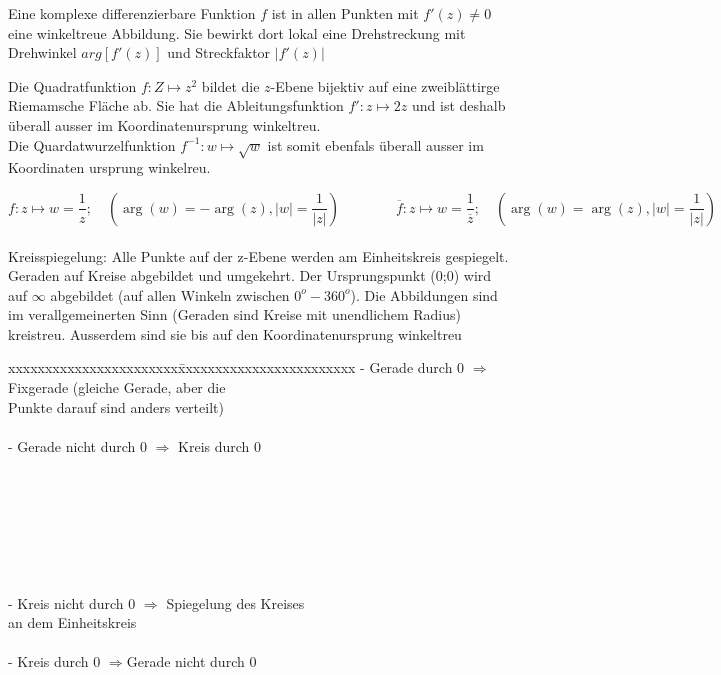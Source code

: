 			Eine komplexe differenzierbare Funktion $f$ ist in allen Punkten mit $f'(z)\neq0$ eine winkeltreue Abbildung. Sie bewirkt dort lokal eine Drehstreckung mit Drehwinkel $arg\left[f'(z)\right]$ und Streckfaktor $\left|f'(z)\right|$

			Die Quadratfunktion $f:Z\mapsto z^2$ bildet die $z$-Ebene bijektiv auf eine zweiblättirge Riemamsche Fläche ab. Sie hat die Ableitungsfunktion $f':z\mapsto 2z$ und ist deshalb überall ausser im Koordinatenursprung winkeltreu.\\
			Die Quardatwurzelfunktion $f^{-1}:w \mapsto \sqrt{w}$ ist somit ebenfals überall ausser im Koordinaten ursprung winkelreu.

  		$$ f : z \mapsto w = \frac{1}{z}; \quad (\arg(w) = -\arg(z), |w| = \frac{1}{|z|})
  		\qquad \qquad 
  		\overline{f}: z \mapsto w = \frac{1}{\overline{z}};  \quad  
  		(\arg(w) = \arg(z), |w| = \frac{1}{|z|}) $$\\
 		Kreisspiegelung: Alle Punkte auf der z-Ebene werden am Einheitskreis gespiegelt. Geraden auf Kreise abgebildet und umgekehrt. Der Ursprungspunkt (0;0) wird auf $ \infty $ abgebildet (auf allen Winkeln zwischen $0^o-360^o$). Die Abbildungen sind im verallgemeinerten Sinn (Geraden sind Kreise mit unendlichem Radius) kreistreu. Ausserdem sind sie bis auf den Koordinatenursprung winkeltreu\\
  		\begin{minipage}{9cm}
    		\begin{tabbing}
	    		xxxxxxxxxxxxxxxxxxxxxxx\=xxxxxxxxxxxxxxxxxxxxxxxx\kill
          		- Gerade durch 0 $\Longrightarrow$ \>Fixgerade (gleiche Gerade, aber die \\ \>Punkte darauf sind anders verteilt)\\ \\
      			- Gerade nicht durch 0 $\Longrightarrow$ Kreis durch 0\\ \\ \\ \\ \\ \\ \\ \\
      			- Kreis nicht durch 0 $\Longrightarrow$ \>Spiegelung des Kreises\\ \> an dem Einheitskreis\\ \\
      			- Kreis durch 0 $\Longrightarrow$\>Gerade nicht durch 0
        	\end{tabbing}
  		\end{minipage}
